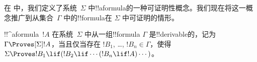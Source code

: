 \documentclass[../../../include/open-logic-section]{subfiles}
\begin{document}


在  中，我们定义了系统~$\Sigma$ 中!!a{formula}的一种可证明性概念。我们现在将这一概念推广到从集合~$\Gamma$ 中的!!{formula}在 $\Sigma$ 中可证明的情形。

\begin{defn}
  !!^a{formula}~$!A$ 在系统~$\Sigma$ 中从一组!!{formula} $\Gamma$ 是!!{derivable}的，记为 $\Gamma \Proves[\Sigma] !A$，当且仅当存在 $!B_1$, \dots, $!B_n \in \Gamma$，使得
  $\Sigma \Proves !B_1 \lif (!B_2 \lif \cdots (!B_n \lif !A)
  \cdots)$。
\end{defn}
\end{document}
